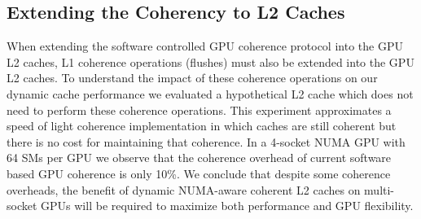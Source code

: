 \subsection{Extending the Coherency to L2 Caches}
When extending the software controlled GPU coherence protocol into the GPU L2 
caches, L1 coherence operations (flushes) must also be extended into the GPU 
L2 caches.  To understand the impact of these coherence operations on our 
dynamic cache performance we evaluated a hypothetical L2 cache which does not 
need to perform these coherence operations.  This experiment approximates a 
speed of light coherence implementation in which caches are still coherent 
but there is no cost for maintaining that coherence. In a 4-socket NUMA GPU 
with 64 SMs per GPU we observe that the coherence overhead of current 
software based GPU coherence is only 10\%. We conclude that despite some 
coherence overheads, the benefit of dynamic NUMA-aware coherent L2 caches on 
multi-socket GPUs will be required to maximize both performance and GPU 
flexibility. 


